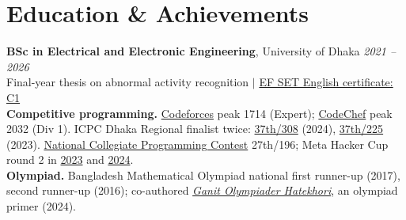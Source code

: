 \documentclass[10pt,a4paper]{article}
\begin{document}
\section*{Education \& Achievements}
\textbf{BSc in Electrical and Electronic Engineering}, University of Dhaka \hfill \textit{2021 -- 2026}\\[1pt]
Final-year thesis on abnormal activity recognition \enspace $|$ \enspace \href{https://cert.efset.org/LEvQnj}{EF SET English certificate: C1}\\[2pt]
{\small\textbf{Competitive programming.} \href{https://codeforces.com/profile/soyeb_p_jim}{Codeforces} peak 1714 (Expert); \href{https://www.codechef.com/users/soyebjim}{CodeChef} peak 2032 (Div 1). ICPC Dhaka Regional finalist twice: \href{https://icpc.global/regionals/finder/Dhaka-2025/standings}{37th/308} (2024), \href{https://icpc.global/regionals/finder/Dhaka-2024/standings}{37th/225} (2023). \href{https://bapsoj.org/contests/ncpc-onsite-2023-hosted-by-ju/standings}{National Collegiate Programming Contest} 27th/196; Meta Hacker Cup round 2 in \href{https://www.facebook.com/codingcompetitions/hacker-cup/2023/certificate/2005569239823325}{2023} and \href{https://www.facebook.com/codingcompetitions/hacker-cup/2024/certificate/2005569239823325}{2024}.\\[1pt]
\textbf{Olympiad.} Bangladesh Mathematical Olympiad national first runner-up (2017), second runner-up (2016); co-authored \href{https://www.rokomari.com/book/288868/gonit-olympiad-er-hate-khori-secondary}{\textit{Ganit Olympiader Hatekhori}}, an olympiad primer (2024).}
\end{document}
